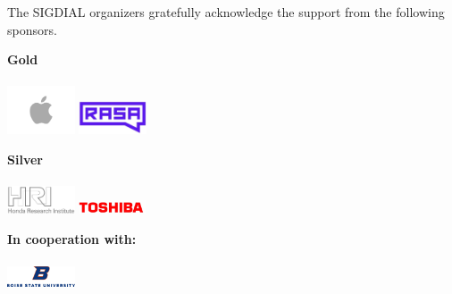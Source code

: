 {\Large The SIGDIAL organizers gratefully acknowledge the support from the following sponsors.}
\bigskip

\vspace*{1cm}

\vspace*{1cm}
\noindent
{\Large \textbf{Gold}}\\\\
\includegraphics[width=2cm]{sponsor_logos/apple.png}\hfill
\includegraphics[width=2cm]{sponsor_logos/rasa.jpg}\hfill
\vspace*{1cm}

\vspace*{1cm}
\noindent
{\Large \textbf{Silver}}\\\\
\includegraphics[width=2cm]{sponsor_logos/honda.png}\hfill
\includegraphics[width=2cm]{sponsor_logos/toshiba.jpeg}\hfill
\vspace*{1cm}

\vspace*{1cm}
\noindent
{\Large \textbf{In cooperation with:}}\\\\
\includegraphics[width=2cm]{sponsor_logos/boise.png}\hfill
\vspace*{1cm}

\newpage
